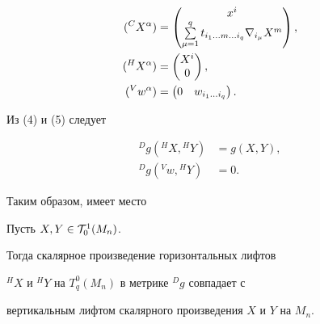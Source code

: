 \begin{align}


({}^CX^\alpha)&=


\begin{pmatrix}


x^i \\ \sum\limits^q_{\mu=1}t_{i_1\dotsc m\dotsc i_q}


\nabla_{i_\mu}X^m


\end{pmatrix}


, \\


({}^HX^\alpha)&=\begin{pmatrix}


X^i \\ 0


\end{pmatrix}


,\notag \\


({}^Vw^\alpha)&=\begin{pmatrix}


0 & w_{i_1\dotsc i_q}


\end{pmatrix}


.\notag


\end{align}


Из (4) и (5) следует


\begin{align}


{}^Dg({}^HX,{}^HY)&=g(X,Y),\\


{}^Dg({}^Vw,{}^HY)&=0.


\end{align}


Таким образом, имеет место





\begin{thm}


Пусть $X,Y\in{\cal T}^1_0(M_n)$.


Тогда скалярное произведение горизонтальных лифтов


${}^HX$ и ${}^HY$ на $T^0_q(M_n)$ в метрике ${}^Dg$ совпадает с


вертикальным лифтом скалярного произведения  $X$ и $Y$ на $M_n$.


\end{thm}





